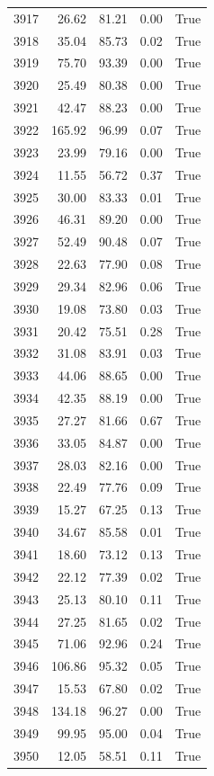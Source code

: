 \begin{longtable}{rrrrr}
3917 & 26.62 & 81.21 & 0.00 & True \\
3918 & 35.04 & 85.73 & 0.02 & True \\
3919 & 75.70 & 93.39 & 0.00 & True \\
3920 & 25.49 & 80.38 & 0.00 & True \\
3921 & 42.47 & 88.23 & 0.00 & True \\
3922 & 165.92 & 96.99 & 0.07 & True \\
3923 & 23.99 & 79.16 & 0.00 & True \\
3924 & 11.55 & 56.72 & 0.37 & True \\
3925 & 30.00 & 83.33 & 0.01 & True \\
3926 & 46.31 & 89.20 & 0.00 & True \\
3927 & 52.49 & 90.48 & 0.07 & True \\
3928 & 22.63 & 77.90 & 0.08 & True \\
3929 & 29.34 & 82.96 & 0.06 & True \\
3930 & 19.08 & 73.80 & 0.03 & True \\
3931 & 20.42 & 75.51 & 0.28 & True \\
3932 & 31.08 & 83.91 & 0.03 & True \\
3933 & 44.06 & 88.65 & 0.00 & True \\
3934 & 42.35 & 88.19 & 0.00 & True \\
3935 & 27.27 & 81.66 & 0.67 & True \\
3936 & 33.05 & 84.87 & 0.00 & True \\
3937 & 28.03 & 82.16 & 0.00 & True \\
3938 & 22.49 & 77.76 & 0.09 & True \\
3939 & 15.27 & 67.25 & 0.13 & True \\
3940 & 34.67 & 85.58 & 0.01 & True \\
3941 & 18.60 & 73.12 & 0.13 & True \\
3942 & 22.12 & 77.39 & 0.02 & True \\
3943 & 25.13 & 80.10 & 0.11 & True \\
3944 & 27.25 & 81.65 & 0.02 & True \\
3945 & 71.06 & 92.96 & 0.24 & True \\
3946 & 106.86 & 95.32 & 0.05 & True \\
3947 & 15.53 & 67.80 & 0.02 & True \\
3948 & 134.18 & 96.27 & 0.00 & True \\
3949 & 99.95 & 95.00 & 0.04 & True \\
3950 & 12.05 & 58.51 & 0.11 & True \\

\end{longtable}

